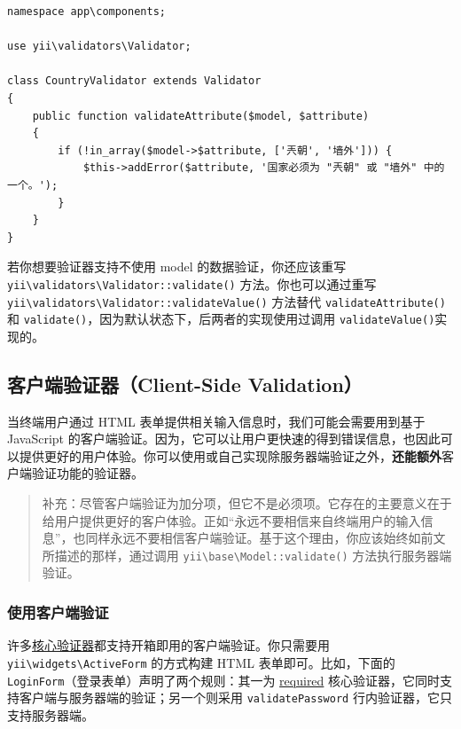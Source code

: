 \lstset{language=php}\begin{lstlisting}
namespace app\components;

use yii\validators\Validator;

class CountryValidator extends Validator
{
    public function validateAttribute($model, $attribute)
    {
        if (!in_array($model->$attribute, ['兲朝', '墙外'])) {
            $this->addError($attribute, '国家必须为 "兲朝" 或 "墙外" 中的一个。');
        }
    }
}
\end{lstlisting}
若你想要验证器支持不使用 model 的数据验证，你还应该重写
\texttt{yii{\allowbreak{}\textbackslash}validators{\allowbreak{}\textbackslash}Validator\allowbreak{}::\allowbreak{}validate()} 方法。你也可以通过重写
\texttt{yii{\allowbreak{}\textbackslash}validators{\allowbreak{}\textbackslash}Validator\allowbreak{}::\allowbreak{}validateValue()} 方法替代
\lstinline|validateAttribute()| 和 \lstinline|validate()|，因为默认状态下，后两者的实现使用过调用
\lstinline|validateValue()|实现的。

\subsection{客户端验证器（Client-Side Validation） \label{input-validation.md::client-side-validation}}
当终端用户通过 HTML 表单提供相关输入信息时，我们可能会需要用到基于 JavaScript 的客户端验证。因为，它可以让用户更快速的得到错误信息，也因此可以提供更好的用户体验。你可以使用或自己实现除服务器端验证之外，\textbf{还能额外}客户端验证功能的验证器。

\begin{quote}补充：尽管客户端验证为加分项，但它不是必须项。它存在的主要意义在于给用户提供更好的客户体验。正如“永远不要相信来自终端用户的输入信息”，也同样永远不要相信客户端验证。基于这个理由，你应该始终如前文所描述的那样，通过调用 \texttt{yii{\allowbreak{}\textbackslash}base{\allowbreak{}\textbackslash}Model\allowbreak{}::\allowbreak{}validate()} 方法执行服务器端验证。

\end{quote}
\subsubsection{使用客户端验证 \label{input-validation.md::using-client-side-validation}}
许多\hyperref[tutorial-core-validators.md]{核心验证器}都支持开箱即用的客户端验证。你只需要用 \texttt{yii{\allowbreak{}\textbackslash}widgets{\allowbreak{}\textbackslash}ActiveForm} 的方式构建 HTML 表单即可。比如，下面的 \lstinline|LoginForm|（登录表单）声明了两个规则：其一为 \hyperref[tutorial-core-validators.md::required]{required} 核心验证器，它同时支持客户端与服务器端的验证；另一个则采用 \lstinline|validatePassword| 行内验证器，它只支持服务器端。

